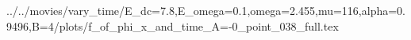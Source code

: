 ../../movies/vary_time/E_dc=7.8,E_omega=0.1,omega=2.455,mu=116,alpha=0.9496,B=4/plots/f_of_phi_x_and_time_A=-0_point_038_full.tex
